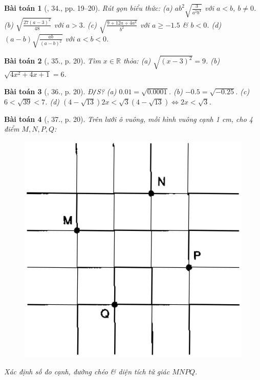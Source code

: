 \documentclass{article}
\newtheorem{baitoan}{Bài toán}
\begin{document}
\begin{baitoan}[\cite{SGK_Toan_9_tap_1}, 34., pp. 19--20]
	Rút gọn biểu thức: (a) $ab^2\sqrt{\frac{3}{a^2b^4}}$ với $a < b$, $b\ne0$. (b) $\sqrt{\frac{27(a - 3)^2}{48}}$ với $a > 3$. (c) $\sqrt{\frac{9 + 12a + 4a^2}{b^2}}$ với $a\ge-1.5$ \& $b < 0$. (d) $(a - b)\sqrt{\frac{ab}{(a - b)^2}}$ với $a < b < 0$.
\end{baitoan}

\begin{baitoan}[\cite{SGK_Toan_9_tap_1}, 35., p. 20]
	Tìm $x\in\mathbb{R}$ thỏa: (a) $\sqrt{(x - 3)^2} = 9$. (b) $\sqrt{4x^2 + 4x + 1} = 6$.
\end{baitoan}

\begin{baitoan}[\cite{SGK_Toan_9_tap_1}, 36., p. 20]
	\emph{Đ\texttt{/}S?} (a) $0.01 = \sqrt{0.0001}$. (b) $-0.5 = \sqrt{-0.25}$. (c) $6 < \sqrt{39} < 7$. (d) $(4 - \sqrt{13})2x < \sqrt{3}(4 - \sqrt{13})\Leftrightarrow2x < \sqrt{3}$.
\end{baitoan}

\begin{baitoan}[\cite{SGK_Toan_9_tap_1}, 37., p. 20]
	Trên lưới ô vuông, mỗi hình vuông cạnh \emph{1 cm}, cho 4 điểm $M,N,P,Q$:
	\begin{figure}[H]
		\centering
		\includegraphics[scale=0.2]{SGK_3_p20}
	\end{figure}
	\noindent Xác định số đo cạnh, đường chéo \& diện tích tứ giác $MNPQ$.
\end{baitoan}
\end{document}
